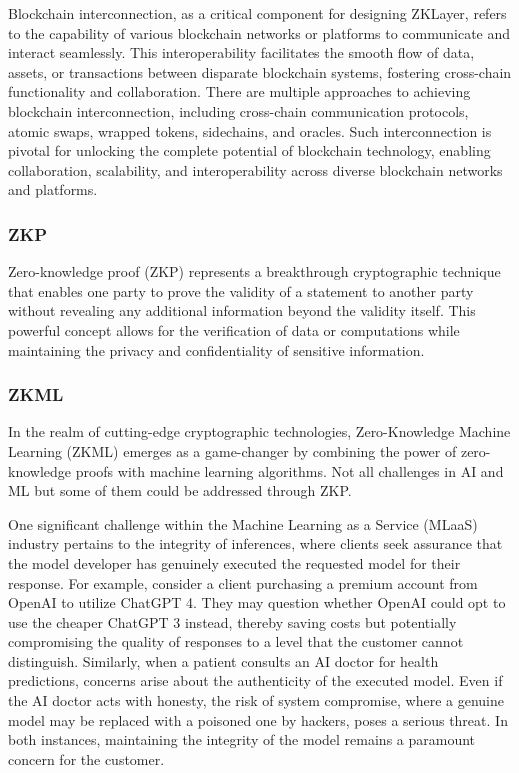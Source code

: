 \documentclass[conference]{IEEEtran}
\begin{document}
Blockchain interconnection, as a critical component for designing ZKLayer, refers to the capability of various blockchain networks or platforms to communicate and interact seamlessly. This interoperability facilitates the smooth flow of data, assets, or transactions between disparate blockchain systems, fostering cross-chain functionality and collaboration. There are multiple approaches to achieving blockchain interconnection, including cross-chain communication protocols, atomic swaps, wrapped tokens, sidechains, and oracles. Such interconnection is pivotal for unlocking the complete potential of blockchain technology, enabling collaboration, scalability, and interoperability across diverse blockchain networks and platforms.

\subsubsection{ZKP}

Zero-knowledge proof (ZKP) represents a breakthrough cryptographic technique that enables one party to prove the validity of a statement to another party without revealing any additional information beyond the validity itself. This powerful concept allows for the verification of data or computations while maintaining the privacy and confidentiality of sensitive information.

\subsubsection{ZKML}

In the realm of cutting-edge cryptographic technologies, Zero-Knowledge Machine Learning (ZKML) emerges as a game-changer by combining the power of zero-knowledge proofs with machine learning algorithms. Not all challenges in AI and ML but some of them could be addressed through ZKP.

One significant challenge within the Machine Learning as a Service (MLaaS) industry pertains to the integrity of inferences, where clients seek assurance that the model developer has genuinely executed the requested model for their response. For example, consider a client purchasing a premium account from OpenAI to utilize ChatGPT 4. They may question whether OpenAI could opt to use the cheaper ChatGPT 3 instead, thereby saving costs but potentially compromising the quality of responses to a level that the customer cannot distinguish. Similarly, when a patient consults an AI doctor for health predictions, concerns arise about the authenticity of the executed model. Even if the AI doctor acts with honesty, the risk of system compromise, where a genuine model may be replaced with a poisoned one by hackers, poses a serious threat. In both instances, maintaining the integrity of the model remains a paramount concern for the customer.
\end{document}
